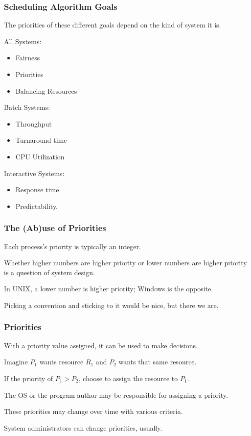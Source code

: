\begin{frame}
\frametitle{Scheduling Algorithm Goals}

The priorities of these different goals depend on the kind of system it is. 

All Systems:
\begin{itemize}
	\item Fairness
	\item Priorities
	\item Balancing Resources
\end{itemize}

Batch Systems:
\begin{itemize}
	\item Throughput
	\item Turnaround time
	\item CPU Utilization
\end{itemize}

Interactive Systems:
\begin{itemize}
	\item Response time.
	\item Predictability.
\end{itemize}

\end{frame}

\begin{frame}
\frametitle{The (Ab)use of Priorities}

Each process's priority is typically an integer. 

Whether higher numbers are higher priority or lower numbers are higher priority is a question of system design. 

In UNIX, a lower number is higher priority; Windows is the opposite. 

Picking a convention and sticking to it would be nice, but there we are.

\end{frame}

\begin{frame}
\frametitle{Priorities}

With a priority value assigned, it can be used to make decisions. 

Imagine $P_{1}$ wants resource $R_{1}$ and $P_{2}$ wants that same resource. 

If the priority of $P_{1} > P_{2}$, choose to assign the resource to $P_{1}$.

The OS or the program author may be responsible for assigning a priority.

These priorities may change over time with various criteria. 

System administrators can change priorities, usually.

\end{frame}

